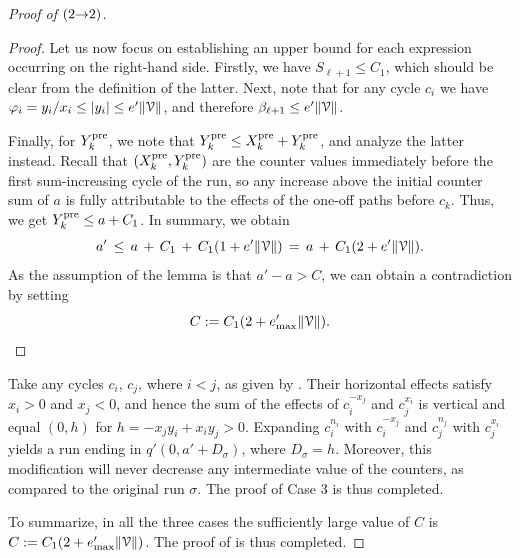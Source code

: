 \begin{proof}[Proof of  $({2}{\rightarrow}{2})$]
\begin{proof}
Let us now focus on establishing an upper bound for each expression occurring
on the right-hand side. Firstly, we have $S_{\ell + 1} \leq C_1$, which should
be clear from the definition of the latter.
Next, note that for any cycle $c_i$ we have $\varphi_i = y_i / x_i \leq |y_i| \leq e' \lVert\mathcal{V}\rVert$,
and therefore $\beta_{\ell + 1} \leq e' \lVert\mathcal{V}\rVert$.

Finally, for $Y^{\mathrm{pre}}_k$, we note that $Y^{\mathrm{pre}}_k \leq X^{\mathrm{pre}}_k + Y^{\mathrm{pre}}_k$, and analyze
the latter instead. Recall that $(X^{\mathrm{pre}}_k, Y^{\mathrm{pre}}_k)$ are the counter values immediately
before the first sum-increasing cycle of the run, so any increase above the initial
counter sum of $a$ is fully attributable to the effects of the one-off paths before $c_k$.
Thus, we get $Y^{\mathrm{pre}}_k \leq a + C_1$. In summary, we obtain
\[
    a' \, \leq \, a \, + \, C_1 \, + \, C_1 (1 + e' \lVert\mathcal{V}\rVert) \,=\, a \, + \, C_1 (2 + e' \lVert\mathcal{V}\rVert).
\]
As the assumption of the lemma is that $a' - a > C$, we can obtain a contradiction
by setting
\[
    C := C_1 (2 + e'_\mathrm{max} \lVert\mathcal{V}\rVert).
    \qedhere
\]
\end{proof}

Take any cycles $c_i$, $c_j$, where $i<j$, as given by . 
Their horizontal effects
satisfy $x_i>0$ and $x_j<0$, and hence
the sum of the effects of $c_i^{-x_j}$ and $c_j^{x_i}$ is vertical and equal 
$(0,h)$ 
for $h = -x_j y_i + x_i y_j > 0$.
Expanding $c_i^{n_i}$ with $c_i^{-x_j}$ and $c_j^{n_j}$ with $c_j^{x_i}$ 
yields a run ending in $q'(0,a'+D_\sigma)$, where $D_\sigma = h$.
Moreover, this modification will never decrease any intermediate value
of the counters, as compared to the original run $\sigma$.
The proof of Case 3 is thus completed.
%

\medskip

To summarize, in all the three cases 
the sufficiently large value of $C$ is $C := C_1 (2 + e'_\mathrm{max}\lVert\mathcal{V}\rVert)$.
The proof of  is thus completed.
\end{proof}


